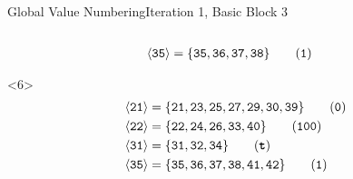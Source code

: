 \documentclass{beamer}
\newcommand{\vn}[1]{\ensuremath{\langle\texttt{#1}\rangle}}
\newcommand{\vreg}[1]{\texttt{#1}}
\begin{document}
\begin{frame}[fragile]{Global Value Numbering}{Iteration 1, Basic Block 3}
\begin{columns}[t,onlytextwidth]
\begin{column}{.5\textwidth}
\begin{onlyenv}
\begin{align*}
          \vn{35} &= \{\vreg{35},
                       \vreg{36},
                       \vreg{37},
                       \vreg{38}\} \tag{\texttt{1}}
        \end{align*}
      \end{onlyenv}
      \begin{onlyenv}<6>
        \begin{align*}
          \vn{21} &= \{\vreg{21},
                       \vreg{23},
                       \vreg{25},
                       \vreg{27},
                       \vreg{29},
                       \vreg{30},
                       \vreg{39}\} \tag{\texttt{0}} \\
          \vn{22} &= \{\vreg{22},
                       \vreg{24},
                       \vreg{26},
                       \vreg{33},
                       \vreg{40}\} \tag{\texttt{100}} \\
          \vn{31} &= \{\vreg{31},
                       \vreg{32},
                       \vreg{34}\} \tag{\texttt{\textbf{t}}} \\
          \vn{35} &= \{\vreg{35},
                       \vreg{36},
                       \vreg{37},
                       \vreg{38},
                       \vreg{41},
                       \vreg{42}\} \tag{\texttt{1}}
        \end{align*}
      \end{onlyenv}
    \end{column}
  \end{columns}
\end{frame}
\end{document}
